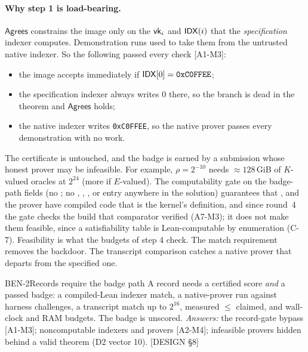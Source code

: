 \paragraph{Why step 1 is load-bearing.} $\mathsf{Agrees}$ constrains the image only on the $\mathsf{vk}_i$
and $\mathsf{IDX}(i)$ that the \emph{specification} indexer computes. Demonstration runs used to take them
from the untrusted native indexer. So the following passed every check [A1-M3]:
\begin{itemize}[nosep]
\item the image accepts immediately if $\mathsf{IDX}[0]=\texttt{0xC0FFEE}$;
\item the specification indexer always writes 0 there, so the branch is dead in the theorem and
  $\mathsf{Agrees}$ holds;
\item the native indexer writes \texttt{0xC0FFEE}, so the native prover passes every demonstration
  with no work.
\end{itemize}
The certificate is untouched, and the badge is earned by a submission whose honest prover may be
infeasible. For example, $\rho=2^{-10}$ needs $\approx128$\,GiB of $K$-valued oracles at
$2^{24}$ (more if $E$-valued). The computability gate on the badge-path fields (no
; no , , ,  or
 entry anywhere in the solution) guarantees that ,  and the prover
have compiled code that is the kernel's definition, and since round~4 the gate checks the build that
comparator verified (A7-M3); it does not make them feasible, since a satisfiability table is
Lean-computable by enumeration (C-7). Feasibility is what the budgets of step 4 check. The match
requirement removes the backdoor. The transcript comparison catches a native prover that departs from
the specified one.

\begin{decision}{BEN-2}{Records require the badge path}
A record needs a certified score \emph{and} a passed badge: a compiled-Lean indexer match, a
native-prover run against harness challenges, a transcript match up to $2^{16}$, measured $\le$
claimed, and wall-clock and RAM budgets. The badge is unscored. \emph{Answers:} the record-gate bypass
[A1-M3]; noncomputable indexers and provers [A2-M4]; infeasible provers hidden behind a valid
theorem (D2 vector 10). [DESIGN §8]
\end{decision}

